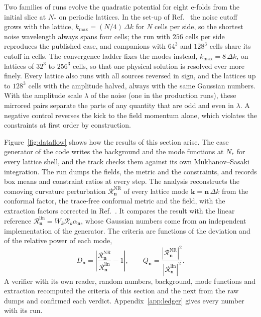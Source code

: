 \documentclass[aps,prd,twocolumn,10pt,superscriptaddress,nofootinbib,longbibliography,floatfix]{revtex4-2}
\begin{document}
Two families of runs evolve the quadratic potential for eight e-folds from the initial slice at $N_*$ on periodic lattices. In the set-up of Ref.~\cite{Launay:2025sinr} the noise cutoff grows with the lattice, $k_\mathrm{max}=(N/4)\,\Delta k$ for $N$ cells per side, so the shortest noise wavelength always spans four cells; the run with $256$ cells per side reproduces the published case, and companions with $64^3$ and $128^3$ cells share its cutoff in cells. The convergence ladder fixes the modes instead, $k_\mathrm{max}=8\,\Delta k$, on lattices of $32^3$ to $256^3$ cells, so that one physical solution is resolved ever more finely. Every lattice also runs with all sources reversed in sign, and the lattices up to $128^3$ cells with the amplitude halved, always with the same Gaussian numbers. With the amplitude scale $\lambda$ of the noise (one in the production runs), these mirrored pairs separate the parts of any quantity that are odd and even in $\lambda$. A negative control reverses the kick to the field momentum alone, which violates the constraints at first order by construction.

Figure~\ref{fig:dataflow} shows how the results of this section arise. The case generator of the code writes the background and the mode functions at $N_*$ for every lattice shell, and the track checks them against its own Mukhanov--Sasaki integration. The run dumps the fields, the metric and the constraints, and records box means and constraint ratios at every step. The analysis reconstructs the comoving curvature perturbation $\mathcal{R}^\mathrm{NR}_{\bm n}$ of every lattice mode $\bm k=\bm n\,\Delta k$ from the conformal factor, the trace-free conformal metric and the field, with the extraction factors corrected in Ref.~\cite{Launay:2026thesis}. It compares the result with the linear reference $\mathcal{R}^\mathrm{lin}_{\bm n}=W_k\mathcal{R}_k\alpha_{\bm n}$, whose Gaussian numbers come from an independent implementation of the generator. The criteria are functions of the deviation and of the relative power of each mode,
\begin{equation}\label{eq:Dn}
D_{\bm n}=\left|\frac{\mathcal{R}^\mathrm{NR}_{\bm n}}{\mathcal{R}^\mathrm{lin}_{\bm n}}-1\right|,\qquad
Q_{\bm n}=\frac{|\mathcal{R}^\mathrm{NR}_{\bm n}|^2}{|\mathcal{R}^\mathrm{lin}_{\bm n}|^2}.
\end{equation}
A verifier with its own reader, random numbers, background, mode functions and extraction recomputed the criteria of this section and the next from the raw dumps and confirmed each verdict. Appendix~\ref{app:ledger} gives every number with its run.
\end{document}
